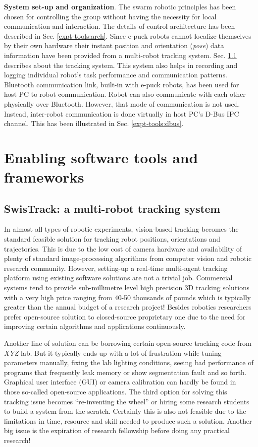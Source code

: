 \textbf{System set-up and organization}. The swarm robotic principles has been chosen for controlling the group without having the necessity for local communication and interaction. The details of control architecture has been described in Sec. \ref{expt-tools:arch}. Since e-puck robots cannot localize themselves by their own hardware  their instant position and orientation ({\em pose}) data information have been provided from a multi-robot tracking system. Sec. \ref{expt-tools:swistrack} describes about the tracking system. This system also helps  in recording and logging individual robot's task performance and communication patterns. Bluetooth communication link, built-in with e-puck robots, has been used for host PC to robot communication. Robot can also communicate with each-other physically over Bluetooth. However, that mode of communication is not used. Instead, inter-robot communication is done virtually in host PC's D-Bus IPC channel. This has been illustrated in Sec. \ref{expt-tools:dbus}.
\section{Enabling software tools and frameworks}
\subsection{SwisTrack: a multi-robot tracking system}
\label{expt-tools:swistrack}
In almost all types of robotic experiments, vision-based tracking becomes the standard feasible solution for tracking robot positions, orientations and trajectories. This is due to the low cost of camera hardware and availability of plenty of standard image-processing algorithms from computer vision and robotic research community. However, setting-up a real-time multi-agent tracking platform using existing software solutions are not a trivial job. Commercial systems tend to provide sub-millimetre level high precision 3D tracking solutions with a very high price ranging from  40-50 thousands of pounds which is typically greater than the annual budget of a research project! Besides robotics researchers prefer open-source solution to closed-source proprietary one due to the need for improving certain algorithms and applications continuously. 

Another line of solution can be borrowing certain open-source tracking code from \textit{XYZ} lab. But it typically ends up with a lot of frustration while tuning parameters manually, fixing the lab lighting conditions, seeing bad performance of programs that frequently leak memory or show segmentation fault and so forth. Graphical user interface (GUI) or camera calibration can hardly be found in those so-called open-source applications. The third option for solving this tracking issue becomes ``re-inventing the wheel'' or hiring some research students to build a system from the scratch. Certainly this is also not feasible due to the limitations in time, resource and skill needed to produce such a solution. Another big issue is the expiration of research fellowship before doing any practical research!

